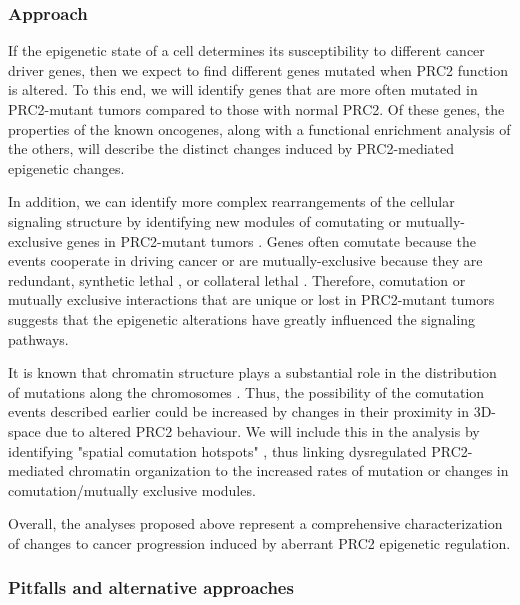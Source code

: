 \subsubsection*{Approach}

If the epigenetic state of a cell determines its susceptibility to different cancer driver genes, then we expect to find different genes mutated when PRC2 function is altered.
To this end, we will identify genes that are more often mutated in PRC2-mutant tumors compared to those with normal PRC2. 
Of these genes, the properties of the known oncogenes, along with a functional enrichment analysis of the others, will describe the distinct changes induced by PRC2-mediated epigenetic changes.

In addition, we can identify more complex rearrangements of the cellular signaling structure by identifying new modules of comutating or mutually-exclusive genes in PRC2-mutant tumors \cite{Miller2011, Vandin2012, Ciriello2012, Jia2014, Zhang2014c, Ahmed2015, Kim2015, Leiserson2015, Babur2015, Leiserson2015b, Dao2017, Leiserson2016, Cho2016a, Reyna2018, Zhang2018e, Bokhari2020QuaDMutNetEx:Frequency.}.
Genes often comutate because the events cooperate in driving cancer or are mutually-exclusive because they are redundant, synthetic lethal \cite{Kaelin2005}, or collateral lethal \cite{Muller2015}.
Therefore, comutation or mutually exclusive interactions that are unique or lost in PRC2-mutant tumors suggests that the epigenetic alterations have greatly influenced the signaling pathways.

It is known that chromatin structure plays a substantial role in the distribution of mutations along the chromosomes \cite{Schuster-Bockler2012, Polak2015, Gonzalez-Perez2019}.
Thus, the possibility of the comutation events described earlier could be increased by changes in their proximity in 3D-space due to altered PRC2 behaviour.
We will include this in the analysis by identifying "spatial comutation hotspots" \cite{Shi2016ChromatinGenes}, thus linking dysregulated PRC2-mediated chromatin organization to the increased rates of mutation or changes in comutation/mutually exclusive modules.

Overall, the analyses proposed above represent a comprehensive characterization of changes to cancer progression induced by aberrant PRC2 epigenetic regulation.


\subsubsection*{Pitfalls and alternative approaches}

